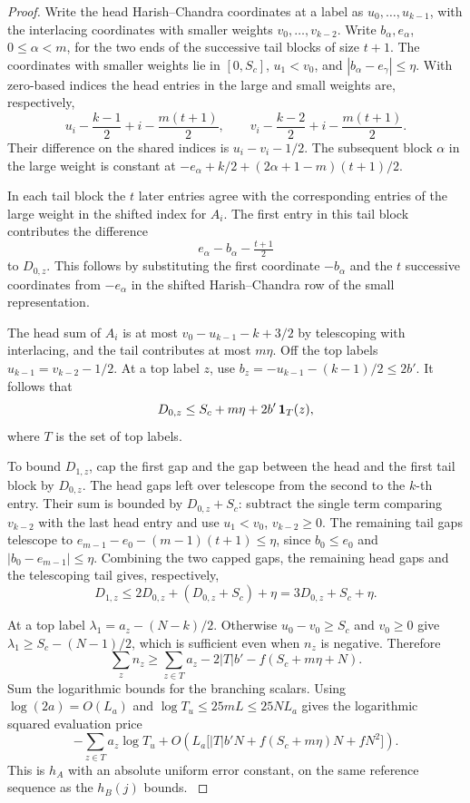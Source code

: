 \begin{proof}

Write the head Harish--Chandra coordinates at a label as
\(u_0,\ldots,u_{k-1}\), with the interlacing coordinates with smaller weights
\(v_0,\ldots,v_{k-2}\). Write \(b_\alpha,e_\alpha\),
\(0\le\alpha<m\), for the two ends of the successive
tail blocks of size \(t+1\). The coordinates with smaller weights lie
in \([0,S_c]\), \(u_1<v_0\), and
\(|b_\alpha-e_\gamma|\le\eta\). With zero-based indices the head entries in the large and
small weights are, respectively,
\[
 u_i-\frac{k-1}{2}+i-\frac{m(t+1)}2,\qquad
 v_i-\frac{k-2}{2}+i-\frac{m(t+1)}2 .
\]
Their difference on the shared indices is \(u_i-v_i-1/2\).
The subsequent block \(\alpha\) in the large weight is constant at
\(-e_\alpha+k/2+(2\alpha+1-m)(t+1)/2\).

In each tail block the \(t\) later entries agree with
the corresponding entries of the large weight in the
shifted index for \(A_i\). The first entry in this tail block contributes the difference
\[
 e_\alpha-b_\alpha-\tfrac{t+1}{2}
\]
to \(D_{0,z}\).
This follows by substituting the first coordinate
\(-b_\alpha\) and the \(t\) successive coordinates
from \(-e_\alpha\) in the shifted Harish--Chandra row
of the small representation.
\label{cor:selected-terminal-height-3}

The head sum of \(A_i\) is at most
\(v_0-u_{k-1}-k+3/2\) by telescoping with interlacing,
and the tail contributes at most \(m\eta\).
Off the top labels \(u_{k-1}=v_{k-2}-1/2\).
At a top label \(z\), use
\(b_z=-u_{k-1}-(k-1)/2\le2b'\).
It follows that
\[
        D_{0,z}\le S_c+m\eta+2b'\,{\bf1}_T(z),
\]
where \(T\) is the set of top labels.

To bound \(D_{1,z}\),
cap the first gap and the gap between the head and the
first tail block by \(D_{0,z}\). The head gaps left
over telescope from the second to the \(k\)-th entry.
Their sum is bounded by \(D_{0,z}+S_c\): subtract the
single term comparing \(v_{k-2}\) with the last head
entry and use \(u_1<v_0\), \(v_{k-2}\ge0\).
The remaining tail gaps telescope to
\(e_{m-1}-e_0-(m-1)(t+1)\le\eta\), since
\(b_0\le e_0\) and \(|b_0-e_{m-1}|\le\eta\).
Combining the two capped gaps, the remaining head gaps and
the telescoping tail gives, respectively,
\[
 D_{1,z}\le2D_{0,z}+(D_{0,z}+S_c)+\eta
                  =3D_{0,z}+S_c+\eta .
\]

At a top label \(\lambda_1=a_z-(N-k)/2\).
Otherwise \(u_0-v_0\ge S_c\) and \(v_0\ge0\)
give \(\lambda_1\ge S_c-(N-1)/2\), which is sufficient
even when \(n_z\) is negative. Therefore
\[
 \sum_z n_z\ge \sum_{z\in T}a_z-2|T|b'-f(S_c+m\eta+N).
\]
Sum the logarithmic bounds for the branching scalars.
Using \(\log(2a)=O(L_a)\) and
\(\log T_u\le25mL\le25N L_a\) gives the logarithmic
squared evaluation price
\[
 -\sum_{z\in T}a_z\log T_u
 +O\!\left(L_a\bigl[|T|b'N
        + f(S_c+m\eta)N+fN^2\bigr]\right).
\]
This is \(h_A\) with an absolute uniform error constant,
on the same reference sequence as the \(h_B(j)\) bounds.
\label{cor:selected-terminal-height-4}
\end{proof}

